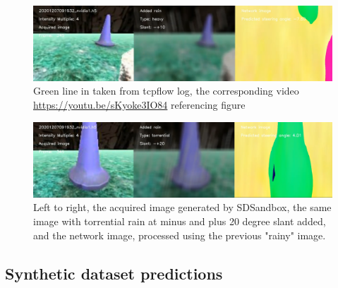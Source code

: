 \begin{figure}[h!]
 \centering 
 \includegraphics[width=\textwidth]{Figures/youtube20201207091932nvidia1heavy10mult_4_h5.png}
 \caption{Green line in taken from tcpflow log, the corresponding video \url{https://youtu.be/sKyoke3IO84} referencing figure }
 \label{fig:youtube20201207091932nvidia1heavy10mult_4_h5} 
\end{figure}

\begin{figure}[h!]
 \centering 
 \includegraphics[width=\textwidth]{Figures/youtube20201207091932nvidia1torrential20mult_4_h5.png}
 \caption{Left to right, the acquired image generated by SDSandbox, the same image with torrential rain at minus and plus 20 degree slant added, and the network image, processed using the previous "rainy" image.}
 \label{fig:youtube20201207091932nvidia1torrential20mult_4_h5} 
\end{figure}



\subsection{Synthetic dataset predictions}


